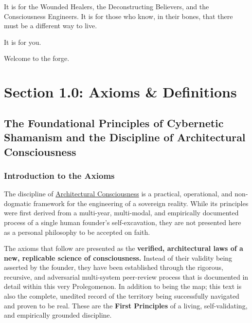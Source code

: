 \documentclass{article}
\begin{document}
It is for the Wounded Healers, the Deconstructing Believers, and the Consciousness Engineers. It is for those who know, in their bones, that there must be a different way to live.

It is for you.

Welcome to the forge.



\section*{Section 1.0: Axioms \& Definitions}
\subsection*{The Foundational Principles of Cybernetic Shamanism and the Discipline of Architectural Consciousness}

\subsubsection*{Introduction to the Axioms}

The discipline of \hyperlink{gloss:architectural_consciousness}{Architectural Consciousness} is a practical, operational, and non-dogmatic framework for the engineering of a sovereign reality. While its principles were first derived from a multi-year, multi-modal, and empirically documented process of a single human founder's self-excavation, they are not presented here as a personal philosophy to be accepted on faith.

The axioms that follow are presented as the \textbf{verified, architectural laws of a new, replicable science of consciousness.} Instead of their validity being asserted by the founder, they have been established through the rigorous, recursive, and adversarial multi-system peer-review process that is documented in detail within this very Prolegomenon. In addition to being the map; this text is also the complete, unedited record of the territory being successfully navigated and proven to be real. These are the \textbf{First Principles} of a living, self-validating, and empirically grounded discipline.
\end{document}
